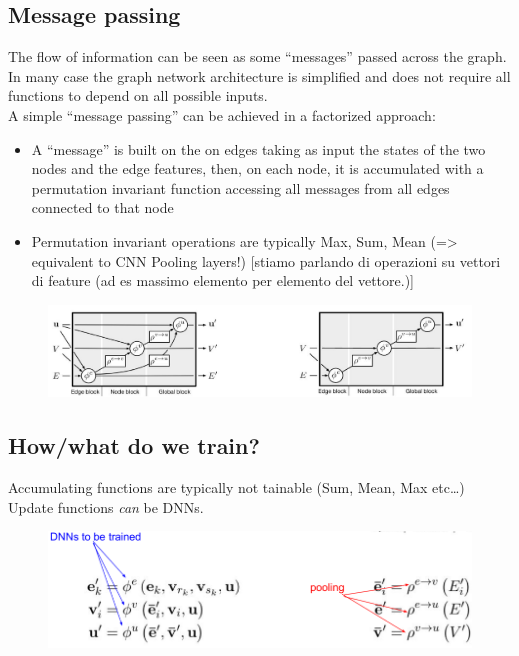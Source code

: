 \subsection{Message passing}
The flow of information can be seen as some “messages” passed across the graph.\\
In many case the graph network architecture is simplified and does not require all
functions to depend on all possible inputs.\\
A simple “message passing” can be achieved in a factorized approach:
\begin{itemize}
	\item A “message” is built on the on edges taking as input the states of the two nodes and the edge features, then,
	on each node, it is accumulated with a permutation invariant function accessing all messages from all edges
	connected to that node
	\item Permutation invariant operations are typically Max, Sum, Mean (=> equivalent to CNN Pooling layers!) [stiamo parlando di operazioni su vettori di feature (ad es massimo elemento per elemento del vettore.)]
\end{itemize}

\begin{figure}[ht]
	\centering
	\includegraphics[width=0.8\linewidth]{figure_ml/mess_pass}
\end{figure}
\FloatBarrier


\subsection{How/what do we train?}

Accumulating functions are typically not tainable (Sum, Mean, Max etc…)\\
Update functions \textit{can} be DNNs.

\begin{figure}[ht]
	\centering
	\includegraphics[width=1\linewidth]{figure_ml/hw_train}
\end{figure}
\FloatBarrier

